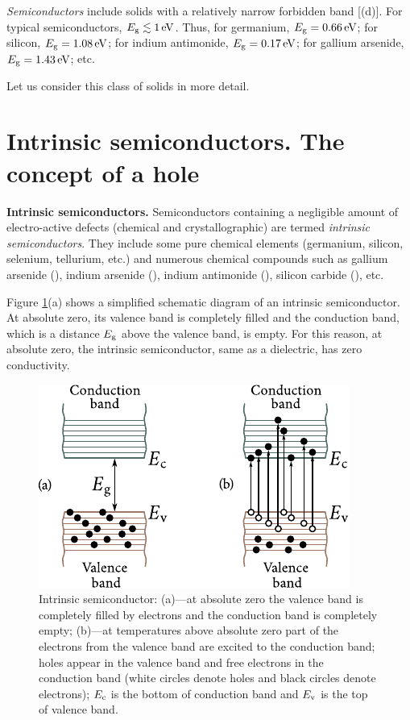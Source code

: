\textit{Semiconductors} include solids with a relatively narrow forbidden band [(d)]. For typical semiconductors, $E_{\text{g}}\lesssim\SI{1}{\electronvolt}$. Thus, for germanium, $E_{\text{g}}=\SI{0.66}{\electronvolt}$; for silicon, $E_{\text{g}}=\SI{1.08}{\electronvolt}$; for indium antimonide, $E_{\text{g}}=\SI{0.17}{\electronvolt}$; for gallium arsenide, $E_{\text{g}}=\SI{1.43}{\electronvolt}$; etc.

Let us consider this class of solids in more detail.

\section{Intrinsic semiconductors. The concept of a hole}\label{sec:43}

\textbf{Intrinsic semiconductors.} Semiconductors containing a negligible amount of electro-active defects (chemical and crystallographic) are termed \textit{intrinsic semiconductors}. They include some pure chemical elements (germanium, silicon, selenium, tellurium, etc.) and numerous chemical compounds such as gallium arsenide (), indium arsenide (), indium antimonide (), silicon carbide (), etc.

Figure \ref{fig:5_14}(a) shows a simplified schematic diagram of an intrinsic semiconductor. At absolute zero, its valence band is completely filled and the conduction band, which is a distance $E_{\text{g}}$ above the valence band, is empty. For this reason, at absolute zero, the intrinsic semiconductor, same as a dielectric, has zero conductivity.

\begin{figure}[t]
	\begin{center}
		\includegraphics[scale=1]{figures/ch_05/fig_5_14.pdf}
		\caption[]{Intrinsic semiconductor: (a)---at absolute zero the valence band is completely filled by electrons and the conduction band is completely empty; (b)---at temperatures above absolute zero part of the electrons from the valence band are excited to the conduction band; holes appear in the valence band and free electrons in the conduction band (white circles denote holes and black circles denote electrons); $E_{\text{c}}$ is the bottom of conduction band and $E_{\text{v}}$ is the top of valence band.}
		\label{fig:5_14}
	\end{center}
	\vspace{-0.7cm}
\end{figure}

